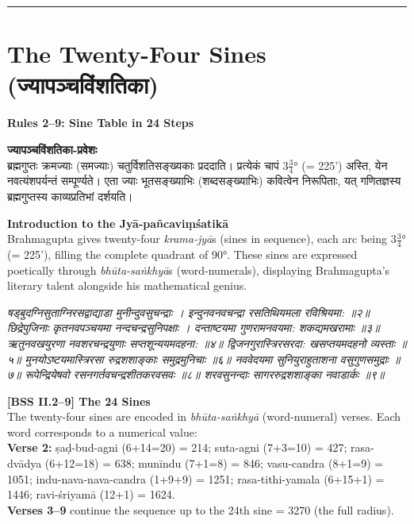 \documentclass[11pt,a4paper]{book}
\newcommand{\dev}[1]{{\devanagarifont #1}}
\newcommand{\bilingual}[2]{%
  \par\vspace{0.6em}%
  \noindent\begin{minipage}[t]{0.48\textwidth}
    \RaggedRight
    #1%
  \end{minipage}%
  \hfill
  \begin{minipage}[t]{0.48\textwidth}
    \RaggedRight
    #2%
  \end{minipage}%
  \par\vspace{0.6em}%
}
\newcommand{\shlokabilingual}[2]{%
  \par\vspace{0.8em}%
  \noindent\begin{minipage}[t]{0.48\textwidth}
    \RaggedRight
    \dev{\textit{#1}}
  \end{minipage}%
  \hfill
  \begin{minipage}[t]{0.48\textwidth}
    \RaggedRight
    #2%
  \end{minipage}%
  \par\vspace{0.8em}%
}
\newcommand{\ruleheadingbilingual}[2]{%
  \par\vspace{0.8em}%
  \noindent\begin{minipage}[t]{0.48\textwidth}
    \textbf{\color{sectioncolor}\dev{#1}}
  \end{minipage}%
  \hfill
  \begin{minipage}[t]{0.48\textwidth}
    \textbf{\color{sectioncolor}#2}
  \end{minipage}%
  \par\vspace{0.4em}%
}
\newcommand{\secdivider}{%
  \begin{center}\rule{0.4\textwidth}{0.5pt}\end{center}%
}
\begin{document}
\secdivider
\clearpage

\section{The Twenty-Four Sines (\dev{ज्यापञ्चविंशतिका})}

\ruleheadingbilingual{नियमाः २--९}{Rules 2--9: Sine Table in 24 Steps}

\bilingual{%
\textbf{\dev{ज्यापञ्चविंशतिका-प्रवेशः}}\\[0.3em]
ब्रह्मगुप्तः क्रमज्याः (समज्याः) चतुर्विशतिसङ्ख्यकाः प्रददाति। प्रत्येकं चापं $3\frac{3}{4}$° (= 225') अस्ति, येन नवत्यंशपर्यन्तं सम्पूर्ण्यते। एता ज्याः भूतसङ्ख्याभिः (शब्दसङ्ख्याभिः) कवित्वेन निरूपिताः, यत्‌ गणितज्ञस्य ब्रह्मगुप्तस्य काव्यप्रतिभां दर्शयति।
}{%
\textbf{Introduction to the Jyā-pañcaviṃśatikā}\\[0.3em]
Brahmagupta gives twenty-four \textit{krama-jyā}s (sines in sequence), each arc being $3\tfrac{3}{4}$° (= 225'), filling the complete quadrant of 90°. These sines are expressed poetically through \textit{bhūta-saṅkhyā}s (word-numerals), displaying Brahmagupta's literary talent alongside his mathematical genius.
}

\vspace{0.5em}

\shlokabilingual{%
षड्बुदग्निसुताग्निरसद्वाद्याडा मुनीन्दुवसुचन्द्राः ।
इन्दुनवनवचन्द्रा रसतिथियमला रविश्रियमा: ॥२॥
छिद्रेपुजिनाः कृतनवपञ्चयमा नन्दचन्द्रसुनिपक्षाः ।
दन्ताष्टयमा गुणरामनवयमा: शकद्यमखरामाः ॥३॥
ऋतुनवखयुरणा नवशरचन्द्रयुणाः सप्तशून्ययमदहना: ॥४॥
द्विजनगुरास्त्रिरसरदा: खसप्तयमदहनो व्यस्ताः ॥५॥
मुनयोऽष्टयमास्त्रिरसा रुद्रशशाङ्काः समुद्रमुनिचाः ॥६॥
नववेदयमा सुनियुराहुताशना वसुगुणसमुद्राः ॥७॥
रूपेन्द्रियेषवो रसनगर्तवचन्द्रशीतकरवसवः ॥८॥
शरवसुनन्दाः सागररुद्रशशाङ्का नवाडार्कः ॥९॥
}{%
\textbf{[BSS II.2--9] The 24 Sines}\\[0.3em]
The twenty-four sines are encoded in \textit{bhūta-saṅkhyā} (word-numeral) verses. Each word corresponds to a numerical value:\\
\textbf{Verse 2:} ṣaḍ-bud-agni (6+14=20) = 214; suta-agni (7+3=10) = 427; rasa-dvādya (6+12=18) = 638; munīndu (7+1=8) = 846; vasu-candra (8+1=9) = 1051; indu-nava-nava-candra (1+9+9) = 1251; rasa-tithi-yamala (6+15+1) = 1446; ravi-śriyamā (12+1) = 1624.\\[0.2em]
\textbf{Verses 3--9} continue the sequence up to the 24th sine = 3270 (the full radius).
}
\end{document}
